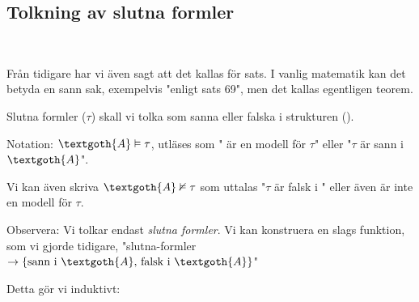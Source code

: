 \subsection{Tolkning av slutna formler}\hfill\\
\par\bigskip
\noindent Från tidigare har vi även sagt att det kallas för sats. I vanlig matematik kan det betyda en sann sak, exempelvis "enligt sats 69", men det kallas egentligen teorem.
\par\bigskip
\noindent Slutna formler ($\tau$) skall vi tolka som sanna eller falska i strukturen ().
\par\bigskip
\noindent Notation: $\textgoth{A}\vDash\tau$, utläses som " är en modell för $\tau$" eller "$\tau$ är sann i $\textgoth{A}$".\par
\noindent Vi kan även skriva $\textgoth{A}\nvDash\tau$ som uttalas "$\tau$  är falsk i " eller även  är inte en modell för $\tau$.
\par\bigskip
\noindent Observera: Vi tolkar endast \textit{slutna formler}. Vi kan konstruera en slags funktion, som vi gjorde tidigare, "slutna-formler$\to\{\text{sann i }\textgoth{A}\text{, falsk i } \textgoth{A}\}$"\par
\noindent Detta gör vi induktivt:
\par\bigskip
